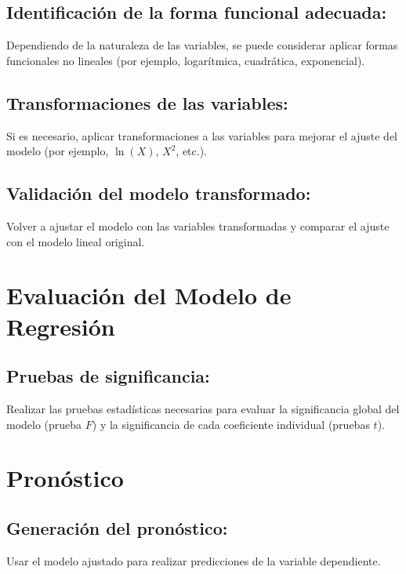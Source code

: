 \documentclass[10pt]{article}
\begin{document}
\subsection{Identificación de la forma funcional adecuada:}
Dependiendo de la naturaleza de las variables, se puede considerar aplicar formas funcionales no lineales (por ejemplo, logarítmica, cuadrática, exponencial).

\subsection{Transformaciones de las variables:}
Si es necesario, aplicar transformaciones a las variables para mejorar el ajuste del modelo (por ejemplo, \( \ln(X) \), \( X^2 \), etc.).

\subsection{Validación del modelo transformado:}
Volver a ajustar el modelo con las variables transformadas y comparar el ajuste con el modelo lineal original.
\section{Evaluación del Modelo de Regresión}
\subsection{Pruebas de significancia:}
Realizar las pruebas estadísticas necesarias para evaluar la significancia global del modelo (prueba \(F\)) y la significancia de cada coeficiente individual (pruebas \(t\)).
\section{Pronóstico}
\subsection{Generación del pronóstico:}
Usar el modelo ajustado para realizar predicciones de la variable dependiente.
\end{document}
